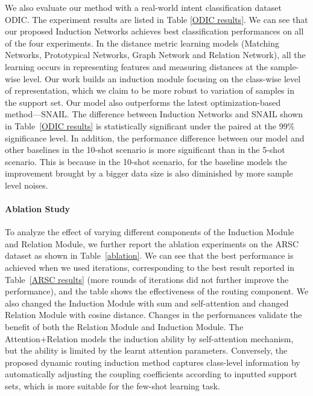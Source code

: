 \documentclass[11pt,a4paper]{article}
\begin{document}
We also evaluate our method with a real-world intent classification dataset ODIC. The experiment results are listed in Table \ref{ODIC results}. We can see that our proposed Induction Networks achieves best classification performances on all of the four experiments. In the distance metric learning models (Matching Networks, Prototypical Networks, Graph Network and Relation Network), all the learning occurs in representing features and measuring distances at the sample-wise level. Our work builds an induction module focusing on the class-wise level of representation, which we claim to be more robust to variation of samples in the support set. Our model also outperforms the latest optimization-based method---SNAIL. The difference between Induction Networks and SNAIL shown in Table~\ref{ODIC results} is statistically significant under the paired at the 99\% significance level. 
In addition, the performance difference between our model and other baselines in the 10-shot scenario is more significant than in the 5-shot scenario. This is because in the 10-shot scenario, for the baseline models the improvement brought by a bigger data size is also diminished by more sample level noises.




\paragraph{Ablation Study} To analyze the effect of varying different components of the Induction Module and Relation Module, we further report the ablation experiments on the ARSC dataset as shown in Table~\ref{ablation}. We can see that the best performance is achieved when we used  iterations, corresponding to the best result reported in Table~\ref{ARSC results} (more rounds of iterations did not further improve the performance), and the table shows the effectiveness of the routing component.
We also changed the Induction Module with sum and self-attention and changed Relation Module with cosine distance. Changes in the performances validate the benefit of both the Relation Module and Induction Module. The Attention+Relation models the induction ability by self-attention mechanism, but the ability is limited by the learnt attention parameters. Conversely, the proposed dynamic routing induction method captures class-level information by automatically adjusting the coupling coefficients according to inputted support sets, which is more suitable for the few-shot learning task.
\end{document}
